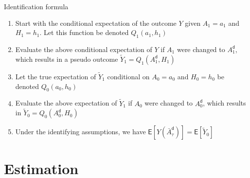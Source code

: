 \documentclass[
  10pt,
  ignorenonframetext,
]{beamer}
\begin{document}
\begin{frame}{Identification formula}
\protect\hypertarget{identification-formula-2}{}
\begin{enumerate}

\item Start with the conditional expectation of the outcome $Y$ given $A_1=a_1$ and $H_1=h_1$. Let this function be denoted $Q_1(a_1, h_1)$
\item Evaluate the above conditional 
  expectation of $Y$ if $A_1$ were changed to $A^\mathsf{d}_1$, which results in 
  a pseudo outcome $\tilde Y_1=Q_1(A^\mathsf{d}_1, H_1)$
\item Let the true expectation of $\tilde Y_1$ conditional on
  $A_0=a_0$ and $H_0=h_0$ be denoted $Q_0(a_0, h_0)$
\item Evaluate the above
  expectation of $\tilde Y_1$ if $A_0$ were changed to $A^\mathsf{d}_0$, which results in
  $\tilde Y_0=Q_0(A^\mathsf{d}_0, H_0)$
\item Under the identifying assumptions, we have
  $\mathsf{E}[Y(\bar{A}_\tau^\mathsf{d})]=\mathsf{E}[\tilde Y_0]$
  
\end{enumerate}
\end{frame}

\hypertarget{estimation}{%
\section{Estimation}\label{estimation}}
\end{document}
